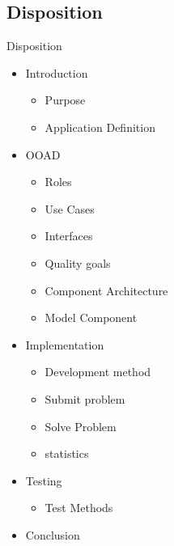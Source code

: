 \subsection*{Disposition}
\begin{frame}{Disposition}
\begin{itemize}
	
	
	\item Introduction
	\begin{itemize}
		\item Purpose 
		\item Application Definition 
	\end{itemize}
	\item OOAD 
	\begin{itemize}
		\item Roles 
		\item Use Cases 
		\item Interfaces 
		\item Quality goals 
		\item Component Architecture 
		\item Model Component	
	\end{itemize}
	\item Implementation 
	\begin{itemize}
		\item Development method 
		\item Submit problem 
		\item Solve Problem 
		\item statistics 
	\end{itemize}	
	\item Testing 
	\begin{itemize}
		\item Test Methods 
	\end{itemize}
	\item Conclusion 
\end{itemize}
\end{frame}